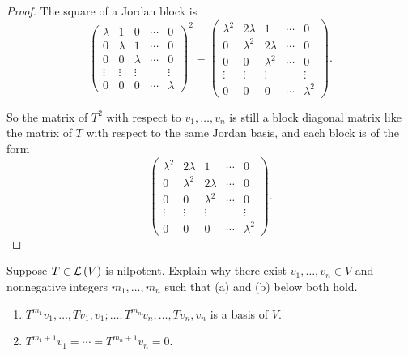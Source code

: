 \begin{proof}
    The square of a Jordan block is
    \[
        {\begin{pmatrix}
                    \lambda & 1       & 0       & \cdots & 0       \\
                    0       & \lambda & 1       & \cdots & 0       \\
                    0       & 0       & \lambda & \cdots & 0       \\
                    \vdots  & \vdots  & \vdots  &        & \vdots  \\
                    0       & 0       & 0       & \cdots & \lambda
                \end{pmatrix}}^{2}
        = \begin{pmatrix}
            \lambda^{2} & 2\lambda    & 1           & \cdots & 0           \\
            0           & \lambda^{2} & 2\lambda    & \cdots & 0           \\
            0           & 0           & \lambda^{2} & \cdots & 0           \\
            \vdots      & \vdots      & \vdots      &        & \vdots      \\
            0           & 0           & 0           & \cdots & \lambda^{2}
        \end{pmatrix}.
    \]

    So the matrix of $T^{2}$ with respect to $v_{1}, \ldots, v_{n}$ is still a block diagonal matrix like the matrix of $T$ with respect to the same Jordan basis, and each block is of the form
    \[
        \begin{pmatrix}
            \lambda^{2} & 2\lambda    & 1           & \cdots & 0           \\
            0           & \lambda^{2} & 2\lambda    & \cdots & 0           \\
            0           & 0           & \lambda^{2} & \cdots & 0           \\
            \vdots      & \vdots      & \vdots      &        & \vdots      \\
            0           & 0           & 0           & \cdots & \lambda^{2}
        \end{pmatrix}.
    \]
\end{proof}
\newpage

\begin{exercise}\label{chapter8:sectionC:exercise9}
    Suppose $T \in \mathcal{L}\left({V}\right)$ is nilpotent. Explain why there exist $v_{1}, \ldots, v_{n} \in V$ and nonnegative integers $m_{1}, \ldots, m_{n}$ such that (a) and (b) below both hold.
    \begin{enumerate}[label={(\alph*)}]
        \item $T^{m_{1}}v_{1}, \ldots, Tv_{1}, v_{1}; \ldots; T^{m_{n}}v_{n}, \ldots, Tv_{n}, v_{n}$ is a basis of $V$.
        \item $T^{m_{1}+1}v_{1} = \cdots = T^{m_{n}+1}v_{n} = 0$.
    \end{enumerate}
\end{exercise}

